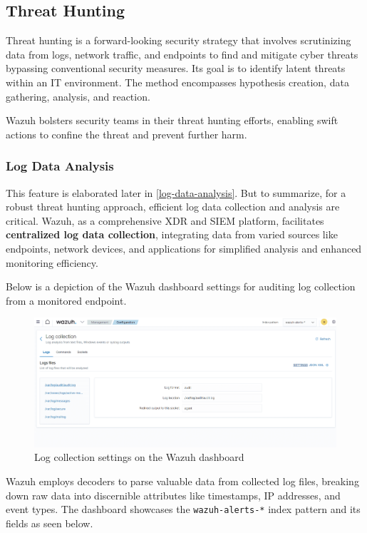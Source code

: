 \subsection{Threat Hunting}
Threat hunting is a forward-looking security strategy that involves scrutinizing data from logs, network traffic, and endpoints to find and mitigate cyber threats bypassing conventional security measures. Its goal is to identify latent threats within an IT environment. The method encompasses hypothesis creation, data gathering, analysis, and reaction.

Wazuh bolsters security teams in their threat hunting efforts, enabling swift actions to confine the threat and prevent further harm.

\subsubsection{Log Data Analysis}
This feature is elaborated later in \ref{log-data-analysis}. But to summarize, for a robust threat hunting approach, efficient log data collection and analysis are critical. Wazuh, as a comprehensive XDR and SIEM platform, facilitates \textbf{centralized log data collection}, integrating data from varied sources like endpoints, network devices, and applications for simplified analysis and enhanced monitoring efficiency.

Below is a depiction of the Wazuh dashboard settings for auditing log collection from a monitored endpoint.

\begin{figure}[H]
    \centering
    \includegraphics[width=\textwidth]{images/threat-hunting/log-collection-settings.png}
    \caption{Log collection settings on the Wazuh dashboard}
    \label{fig:log-collection-settings}
\end{figure}

Wazuh employs decoders to parse valuable data from collected log files, breaking down raw data into discernible attributes like timestamps, IP addresses, and event types. The dashboard showcases the \texttt{wazuh-alerts-*} index pattern and its fields as seen below.

